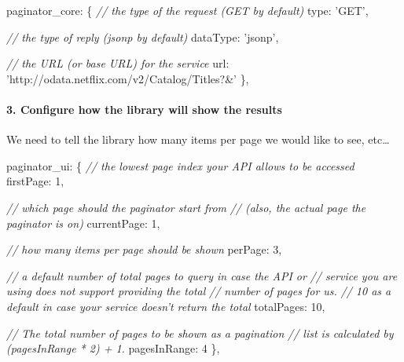 \documentclass[9pt]{book}
\newenvironment{Shaded}{}{}
\newcommand{\DataTypeTok}[1]{\textcolor[rgb]{0.56,0.13,0.00}{{#1}}}
\newcommand{\DecValTok}[1]{\textcolor[rgb]{0.25,0.63,0.44}{{#1}}}
\newcommand{\StringTok}[1]{\textcolor[rgb]{0.25,0.44,0.63}{{#1}}}
\newcommand{\CommentTok}[1]{\textcolor[rgb]{0.38,0.63,0.69}{\textit{{#1}}}}
\newcommand{\NormalTok}[1]{{#1}}
\begin{document}
\begin{Shaded}
\begin{Highlighting}[]
    \NormalTok{paginator_core: \{}
      \CommentTok{// the type of the request (GET by default)}
      \DataTypeTok{type}\NormalTok{: }\StringTok{'GET'}\NormalTok{,}

      \CommentTok{// the type of reply (jsonp by default)}
      \DataTypeTok{dataType}\NormalTok{: }\StringTok{'jsonp'}\NormalTok{,}

      \CommentTok{// the URL (or base URL) for the service}
      \DataTypeTok{url}\NormalTok{: }\StringTok{'http://odata.netflix.com/v2/Catalog/Titles?&'}
    \NormalTok{\},}
\end{Highlighting}
\end{Shaded}

\paragraph{3. Configure how the library will show the
results}\label{configure-how-the-library-will-show-the-results-1}

We need to tell the library how many items per page we would like to
see, etc\ldots{}

\begin{Shaded}
\begin{Highlighting}[]
    \NormalTok{paginator_ui: \{}
      \CommentTok{// the lowest page index your API allows to be accessed}
      \DataTypeTok{firstPage}\NormalTok{: }\DecValTok{1}\NormalTok{,}

      \CommentTok{// which page should the paginator start from}
      \CommentTok{// (also, the actual page the paginator is on)}
      \DataTypeTok{currentPage}\NormalTok{: }\DecValTok{1}\NormalTok{,}

      \CommentTok{// how many items per page should be shown}
      \DataTypeTok{perPage}\NormalTok{: }\DecValTok{3}\NormalTok{,}

      \CommentTok{// a default number of total pages to query in case the API or}
      \CommentTok{// service you are using does not support providing the total}
      \CommentTok{// number of pages for us.}
      \CommentTok{// 10 as a default in case your service doesn't return the total}
      \DataTypeTok{totalPages}\NormalTok{: }\DecValTok{10}\NormalTok{,}

      \CommentTok{// The total number of pages to be shown as a pagination}
      \CommentTok{// list is calculated by (pagesInRange * 2) + 1.}
      \DataTypeTok{pagesInRange}\NormalTok{: }\DecValTok{4}
    \NormalTok{\},}
\end{Highlighting}
\end{Shaded}
\end{document}
